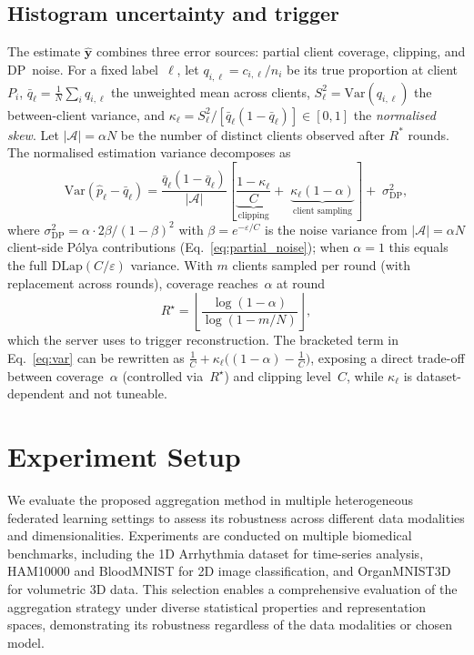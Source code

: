 \documentclass[runningheads]{llncs}
\begin{document}
\subsection{Histogram uncertainty and trigger}\label{sec:trigger}

The estimate $\hat{\mathbf{y}}$ combines three error sources: partial client coverage, clipping, and DP~noise.
For a fixed label~$\ell$, let $q_{i,\ell}=c_{i,\ell}/n_i$ be its true proportion at client~$P_i$, $\bar{q}_\ell=\frac{1}{N}\sum_i q_{i,\ell}$ the unweighted mean across clients, $S_\ell^2=\mathrm{Var}(q_{i,\ell})$ the between-client variance, and $\kappa_\ell=S_\ell^2/[\bar{q}_\ell(1\!-\!\bar{q}_\ell)]\in[0,1]$ the \emph{normalised skew}.
Let $|\mathcal{A}|=\alpha N$ be the number of distinct clients observed after $R^*$ rounds.
The normalised estimation variance decomposes as
\begin{equation}\label{eq:var}
\mathrm{Var}(\hat{p}_\ell-\bar{q}_\ell)=
\frac{\bar{q}_\ell(1-\bar{q}_\ell)}{|\mathcal{A}|}
\left[
\underbrace{\frac{1-\kappa_\ell}{C}}_{\text{clipping}}
+\;
\underbrace{\kappa_\ell(1-\alpha)}_{\text{client sampling}}
\right]
+\;\sigma^2_{\mathrm{DP}},
\end{equation}
where $\sigma^2_{\mathrm{DP}}=\alpha\cdot 2\beta/(1\!-\!\beta)^2$ with $\beta=e^{-\varepsilon/C}$ is the noise variance from $|\mathcal{A}|=\alpha N$ client-side P\'{o}lya contributions (Eq.~\eqref{eq:partial_noise}); when $\alpha=1$ this equals the full $\mathrm{DLap}(C/\varepsilon)$ variance.
With $m$ clients sampled per round (with replacement across rounds), coverage reaches~$\alpha$ at round
\begin{equation}\label{eq:trigger}
R^\star=
\left\lfloor
\frac{\log(1-\alpha)}{\log\!\left(1-{m}/{N}\right)}
\right\rfloor,
\end{equation}
which the server uses to trigger reconstruction.
The bracketed term in Eq.~\eqref{eq:var} can be rewritten as $\tfrac{1}{C}+\kappa_\ell\!\bigl((1\!-\!\alpha)-\tfrac{1}{C}\bigr)$, exposing a direct trade-off between coverage~$\alpha$ (controlled via~$R^\star$) and clipping level~$C$, while $\kappa_\ell$ is dataset-dependent and not tuneable.

\section{Experiment Setup}

We evaluate the proposed aggregation method in multiple heterogeneous federated learning settings to assess its robustness across different data modalities and dimensionalities. Experiments are conducted on multiple biomedical benchmarks, including the 1D Arrhythmia dataset for time-series analysis, HAM10000 and BloodMNIST for 2D image classification, and OrganMNIST3D for volumetric 3D data. This selection enables a comprehensive evaluation of the aggregation strategy under diverse statistical properties and representation spaces, demonstrating its robustness regardless of the data modalities or chosen model.
\end{document}
